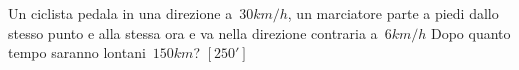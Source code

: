 \begin{multicols}{2}
\begin{esercizio}[\Ast]
\label{ese:14.64}
Un ciclista pedala in una direzione a~$30\unit{km/h}$, un marciatore parte a 
piedi dallo stesso punto e alla stessa ora e va nella direzione contraria 
a~$6\unit{km/h}$ Dopo quanto tempo saranno lontani~$150\unit{km}$?
 \hfill $\left[250'\right]$
\end{esercizio}

% 
% 
% 


\end{multicols}
